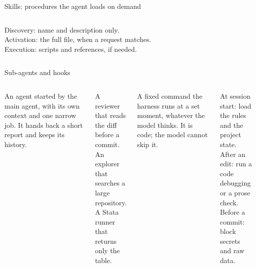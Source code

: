 \begin{frame}{Skills: procedures the agent loads on demand}
  \begin{columns}[T,onlytextwidth]
      {\small
      \vspace{0.7em}
      {\color{muted}Discovery: name and description only.\\
      Activation: the full file, when a request matches.\\
      Execution: scripts and references, if needed.\par}
      \vspace{0.7em}
      {\par}}
  \end{columns}
\end{frame}

\begin{frame}{Sub-agents and hooks}
  \vspace{0.6em}
  \begin{columns}[T,onlytextwidth]
      {\small An agent started by the main agent, with its own context and one narrow job. It hands back a short report and keeps its history.\par}
      \vspace{0.6em}
      {\small\color{muted}
      A reviewer that reads the diff before a commit.\\[0.2em]
      An explorer that searches a large repository.\\[0.2em]
      A Stata runner that returns only the table.\par}
      {\small A fixed command the harness runs at a set moment, whatever the model thinks. It is code; the model cannot skip it.\par}
      \vspace{0.6em}
      {\small\color{muted}
      At session start: load the rules and the project state.\\[0.2em]
      After an edit: run a code debugging or a prose check.\\[0.2em]
      Before a commit: block secrets and raw data.\par}
  \end{columns}
  \vspace{1.8em}
\end{frame}

